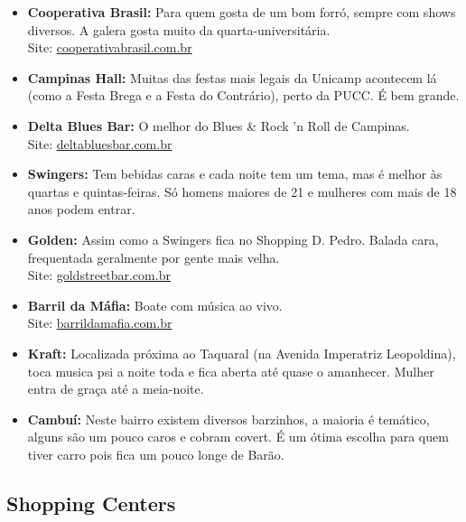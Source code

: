 \begin{itemize}
\item   \textbf{Cooperativa Brasil:} Para quem gosta de um bom forró, sempre com
        shows diversos. A galera gosta muito da quarta-universitária.
        \\Site: \url{cooperativabrasil.com.br}

\item   \textbf{Campinas Hall:} Muitas das festas mais legais da Unicamp
        acontecem lá (como a Festa Brega e a Festa do Contrário), perto da PUCC.
        É bem grande.

\item   \textbf{Delta Blues Bar:} O melhor do Blues \& Rock 'n Roll de
        Campinas.
        \\Site: \url{deltabluesbar.com.br}

\item   \textbf{Swingers:} Tem bebidas caras e cada noite tem um tema, mas
        é melhor às quartas e quintas-feiras. Só homens maiores de 21 e mulheres
        com mais de 18 anos podem entrar.

\item   \textbf{Golden:} Assim como a Swingers fica no Shopping D. Pedro. Balada
        cara, frequentada geralmente por gente mais velha.
        \\Site: \url{goldstreetbar.com.br}

\item   \textbf{Barril da Máfia:} Boate com música ao vivo.
        \\Site: \url{barrildamafia.com.br}

\item   \textbf{Kraft:} Localizada próxima ao Taquaral (na Avenida Imperatriz
        Leopoldina), toca musica psi a noite toda e fica aberta até quase
        o amanhecer. Mulher entra de graça até a meia-noite.

\item   \textbf{Cambuí:} Neste bairro existem diversos barzinhos, a maioria
        é temático, alguns são um pouco caros e cobram covert. É um ótima escolha
        para quem tiver carro pois fica um pouco longe de Barão.

\end{itemize}

\subsection{Shopping Centers}

